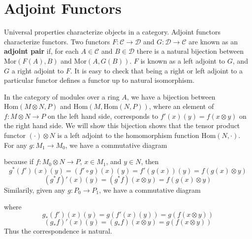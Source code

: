 \section{Adjoint Functors}

Universal properties characterize objects in a category. Adjoint functors characterize functors. Two functors $F: \mathcal{C} \to \mathcal{D}$ and $G: \mathcal{D} \to \mathcal{C}$ are known as an {\bf adjoint pair} if, for each $A \in \mathcal{C}$ and $B \in \mathcal{D}$ there is a natural bijection between $\text{Mor}(F(A), B)$ and $\text{Mor}(A,G(B))$. $F$ is known as a left adjoint to $G$, and $G$ a right adjoint to $F$. It is easy to check that being a right or left adjoint to a particular functor defines a functor up to natural isomorphism.

\begin{example}
    In the category of modules over a ring $A$, we have a bijection between $\text{Hom}(M \otimes N, P)$ and $\text{Hom}(M, \text{Hom}(N,P))$, where an element of $f: M \otimes N \to P$ on the left hand side, corresponds to $f'(x)(y) = f(x \otimes y)$ on the right hand side. We will show this bijection shows that the tensor product functor $(\cdot) \otimes N$ is a left adjoint to the homomorphism function $\text{Hom}(N,\cdot)$. For any $g: M_1 \to M_0$, we have a commutative diagram
    \begin{center}
    \end{center}
    because if $f: M_0 \otimes N \to P$, $x \in M_1$, and $y \in N$, then
    \[ g^*(f')(x)(y) = (f' \circ g)(x)(y) = f'(g(x))(y) = f(g(x) \otimes y) \]
    \[ (g^* f)'(x)(y) = (g^* f)(x \otimes y) = f(g(x) \otimes y) \]
    Similarily, given any $g: P_0 \to P_1$, we have a commutative diagram
    \begin{center}
    \end{center}
    where
    \[ g_*(f')(x)(y) = g(f'(x)(y)) = g(f(x \otimes y)) \]
    \[ (g_* f)'(x)(y) = (g_* f)(x \otimes y) = g(f(x \otimes y)) \]
    Thus the correspondence is natural.
\end{example}

